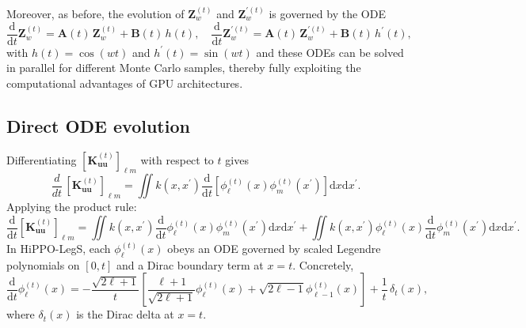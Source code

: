Moreover, as before, the evolution of \(\mathbf{Z}_{w}^{(t)}\) and \(\mathbf{Z}_{w}^{\prime(t)}\) is governed by the ODE
\begin{equation}
    \frac{\mathrm{d}}{\mathrm{d}t}\mathbf{Z}_{w}^{(t)} = \mathbf{A}(t)\,\mathbf{Z}_{w}^{(t)} + \mathbf{B}(t)\,h(t), \quad \frac{\mathrm{d}}{\mathrm{d}t}\mathbf{Z}_{w}^{\prime(t)} = \mathbf{A}(t)\,\mathbf{Z}_{w}^{\prime(t)} + \mathbf{B}(t)\,h^{\prime}(t),
\end{equation}
with \( h(t) = \cos(wt) \) and \( {h}^{\prime}(t) = \sin(wt) \) and these ODEs can be solved in parallel for different Monte Carlo samples, thereby fully exploiting the computational advantages of GPU architectures.

\subsection{Direct ODE evolution}
\label{appendix:direct-ode-hippo-legs}

Differentiating $[\mathbf{K}_{\mathbf{uu}}^{(t)}]_{\ell m}$ with respect to $t$ gives
\begin{equation}
\frac{d}{dt}\,[\mathbf{K}_{\mathbf{uu}}^{(t)}]_{\ell m}
=
\iint
k(x,x^{\prime})
\frac{\mathrm{d}}{\mathrm{d}t}
\left[\phi_{\ell}^{(t)}(x)\phi_{m}^{(t)}(x^{\prime})\right]
\mathrm{d}x\mathrm{d}x^{\prime}.
\end{equation}
Applying the product rule:
\begin{equation}
\frac{\mathrm{d}}{\mathrm{d}t}[\mathbf{K}_{\mathbf{uu}}^{(t)}]_{\ell m}
=
\iint
k(x,x^{\prime})\frac{\mathrm{d}}{\mathrm{d}t}\phi_{\ell}^{(t)}(x)\phi_{m}^{(t)}(x^{\prime})\mathrm{d}x\mathrm{d}x^{\prime}
+
\iint
k(x,x^{\prime})\phi_{\ell}^{(t)}(x)\frac{\mathrm{d}}{\mathrm{d}t}\phi_{m}^{(t)}(x^{\prime})\mathrm{d}x\mathrm{d}x^{\prime}.
\end{equation}
In HiPPO-LegS, each $\phi_{\ell}^{(t)}(x)$ obeys an ODE governed by scaled Legendre polynomials on $[0,t]$ and a Dirac boundary term at $x=t$. Concretely,
\begin{equation}
\frac{\mathrm{d}}{\mathrm{d}t}\phi_{\ell}^{(t)}(x)
=
-\frac{\sqrt{2\ell+1}}{t}
\left[
\frac{\ell+1}{\sqrt{2\ell+1}}\phi_{\ell}^{(t)}(x)
+
\sqrt{2\ell-1}\phi_{\ell-1}^{(t)}(x)
\right]
+
\frac{1}{t}\,\delta_{t}(x),
\end{equation}
where $\delta_{t}(x)$ is the Dirac delta at $x=t$.

